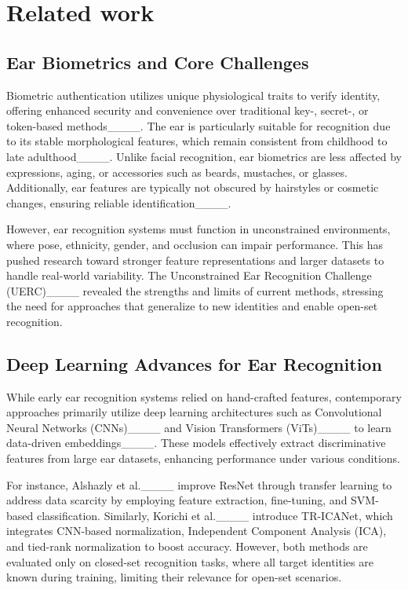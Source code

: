 \section{Related work}
\subsection{Ear Biometrics and Core Challenges} Biometric authentication utilizes unique physiological traits to verify identity, offering enhanced security and convenience over traditional key-, secret-, or token-based methods____. The ear is particularly suitable for recognition due to its stable morphological features, which remain consistent from childhood to late adulthood____. Unlike facial recognition, ear biometrics are less affected by expressions, aging, or accessories such as beards, mustaches, or glasses. Additionally, ear features are typically not obscured by hairstyles or cosmetic changes, ensuring reliable identification____.

However, ear recognition systems must function in unconstrained environments, where pose, ethnicity, gender, and occlusion can impair performance. This has pushed research toward stronger feature representations and larger datasets to handle real-world variability. The Unconstrained Ear Recognition Challenge (UERC)____ revealed the strengths and limits of current methods, stressing the need for approaches that generalize to new identities and enable open-set recognition.

\subsection{Deep Learning Advances for Ear Recognition}
While early ear recognition systems relied on hand-crafted features, contemporary approaches primarily utilize deep learning architectures such as Convolutional Neural Networks (CNNs)____ and Vision Transformers (ViTs)____ to learn data-driven embeddings____. These models effectively extract discriminative features from large ear datasets, enhancing performance under various conditions.

For instance, Alshazly et al.____ improve ResNet through transfer learning to address data scarcity by employing feature extraction, fine-tuning, and SVM-based classification. Similarly, Korichi et al.____ introduce TR-ICANet, which integrates CNN-based normalization, Independent Component Analysis (ICA), and tied-rank normalization to boost accuracy. However, both methods are evaluated only on closed-set recognition tasks, where all target identities are known during training, limiting their relevance for open-set scenarios.

